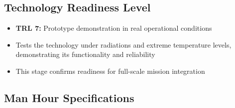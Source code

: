 \documentclass[12pt,a4paper]{article}
\begin{document}
\subsection{Technology Readiness Level}
    \begin{itemize}
        \item \textbf{TRL 7:} Prototype demonstration in real operational conditions
        \item Tests the technology under radiations and extreme temperature levels, demonstrating its functionality and reliability
        \item This stage confirms readiness for full-scale mission integration
    \end{itemize}

\clearpage

\subsection{Man Hour Specifications}
\end{document}
